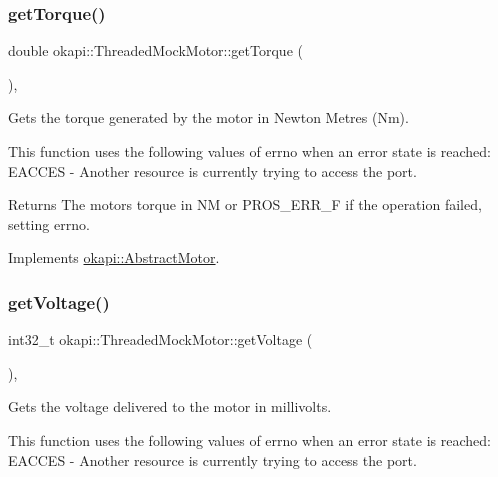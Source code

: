 \subsubsection{\texorpdfstring{getTorque()}{getTorque()}}
{\footnotesize\ttfamily double okapi\+::\+Threaded\+Mock\+Motor\+::get\+Torque (\begin{DoxyParamCaption}{ }\end{DoxyParamCaption})\hspace{0.3cm}{\ttfamily [override]}, {\ttfamily [virtual]}}



Gets the torque generated by the motor in Newton Metres (Nm). 

This function uses the following values of errno when an error state is reached\+: E\+A\+C\+C\+ES -\/ Another resource is currently trying to access the port.

\begin{DoxyReturn}{Returns}
The motor\textquotesingle{}s torque in NM or P\+R\+O\+S\+\_\+\+E\+R\+R\+\_\+F if the operation failed, setting errno. 
\end{DoxyReturn}


Implements \mbox{\hyperlink{classokapi_1_1AbstractMotor_a955818baa689b279b36dda6a74f15d4e}{okapi\+::\+Abstract\+Motor}}.

\mbox{\label{classokapi_1_1ThreadedMockMotor_a2a83224b5d791c3aff254b97f783cff2}} 
\subsubsection{\texorpdfstring{getVoltage()}{getVoltage()}}
{\footnotesize\ttfamily int32\+\_\+t okapi\+::\+Threaded\+Mock\+Motor\+::get\+Voltage (\begin{DoxyParamCaption}{ }\end{DoxyParamCaption})\hspace{0.3cm}{\ttfamily [override]}, {\ttfamily [virtual]}}



Gets the voltage delivered to the motor in millivolts. 

This function uses the following values of errno when an error state is reached\+: E\+A\+C\+C\+ES -\/ Another resource is currently trying to access the port.

